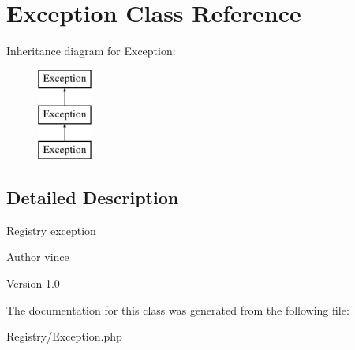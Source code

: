 \hypertarget{class_anemo_1_1_registry_1_1_exception}{
\section{Exception Class Reference}
\label{class_anemo_1_1_registry_1_1_exception}
}
Inheritance diagram for Exception:\begin{figure}[H]
\begin{center}
\leavevmode
\includegraphics[height=3.000000cm]{class_anemo_1_1_registry_1_1_exception}
\end{center}
\end{figure}


\subsection{Detailed Description}
\hyperlink{class_anemo_1_1_registry}{Registry} exception \begin{DoxyAuthor}{Author}
vince 
\end{DoxyAuthor}
\begin{DoxyVersion}{Version}
1.0 
\end{DoxyVersion}


The documentation for this class was generated from the following file:\begin{DoxyCompactItemize}
\item 
Registry/Exception.php\end{DoxyCompactItemize}
